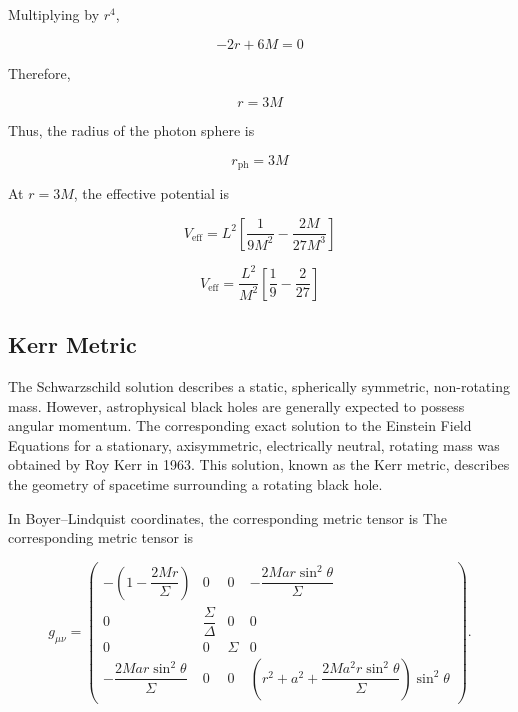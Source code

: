\documentclass[12pt]{article}
\begin{document}
\begin{itemize}
Multiplying by $r^4$,

\begin{equation}
-2r+6M=0
\end{equation}

Therefore,

\begin{equation}
r=3M
\end{equation}

Thus, the radius of the photon sphere is

\begin{equation}
\boxed{r_{\mathrm{ph}}=3M}
\end{equation}

At $r=3M$, the effective potential is

\begin{equation}
V_{\mathrm{eff}}
=
L^2
\left[
\frac{1}{9M^2}
-
\frac{2M}{27M^3}
\right]
\end{equation}

\begin{equation}
V_{\mathrm{eff}}
=
\frac{L^2}{M^2}
\left[
\frac{1}{9}
-
\frac{2}{27}
\right]
\end{equation}
\newpage
\subsection{Kerr Metric}

The Schwarzschild solution describes a static, spherically symmetric, non-rotating mass. However, astrophysical black holes are generally expected to possess angular momentum. The corresponding exact solution to the Einstein Field Equations for a stationary, axisymmetric, electrically neutral, rotating mass was obtained by Roy Kerr in 1963. This solution, known as the Kerr metric, describes the geometry of spacetime surrounding a rotating black hole.

In Boyer--Lindquist coordinates, the corresponding metric tensor is
The corresponding metric tensor is

\begin{equation}
g_{\mu\nu}
=
\begin{pmatrix}
-\left(1-\dfrac{2Mr}{\Sigma}\right)
&
0
&
0
&
-\dfrac{2Mar\sin^2\theta}{\Sigma}
\\[0.8em]
0
&
\dfrac{\Sigma}{\Delta}
&
0
&
0
\\[0.8em]
0
&
0
&
\Sigma
&
0
\\[0.8em]
-\dfrac{2Mar\sin^2\theta}{\Sigma}
&
0
&
0
&
\left(
r^2+a^2+\dfrac{2Ma^2r\sin^2\theta}{\Sigma}
\right)\sin^2\theta
\end{pmatrix}.
\end{equation}


\end{itemize}
\end{document}
